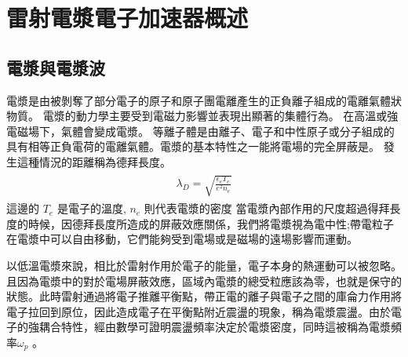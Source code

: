 \chapter{雷射電漿電子加速器概述}

\section{電漿與電漿波}

電漿是由被剝奪了部分電子的原子和原子團電離產生的正負離子組成的電離氣體狀物質。
電漿的動力學主要受到電磁力影響並表現出顯著的集體行為。
在高溫或強電磁場下，氣體會變成電漿。
等離子體是由離子、電子和中性原子或分子組成的具有相等正負電荷的電離氣體。電漿的基本特性之一能將電場的完全屏蔽是。
發生這種情況的距離稱為德拜長度\cite{Buck2011}。
\begin{align}
  \begin{split}
    \lambda_{D} = \sqrt{\frac{\epsilon_e T_e}{e^{2} n_e}}
  \end{split}
\end{align}
這邊的  \(T_e\) 是電子的溫度,  \(n_e\) 則代表電漿的密度
當電漿內部作用的尺度超過得拜長度的時候，因德拜長度所造成的屏蔽效應關係，我們將電漿視為電中性;帶電粒子在電漿中可以自由移動，它們能夠受到電場或是磁場的遠場影響而運動。

以低溫電漿來說，相比於雷射作用於電子的能量，電子本身的熱運動可以被忽略。且因為電漿中的對於電場屏蔽效應，區域內電漿的總受粒應該為零，也就是保守的狀態。此時雷射通過將電子推離平衡點，帶正電的離子與電子之間的庫侖力作用將電子拉回到原位，因此造成電子在平衡點附近震盪的現象，稱為電漿震盪。由於電子的強耦合特性，經由數學可證明震盪頻率決定於電漿密度，同時這被稱為電漿頻率\(\omega_{p}\) \cite{Koschitzki:2017qlg}。

